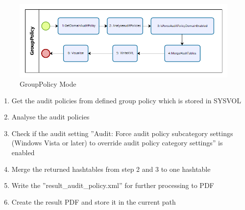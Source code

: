 \clearpage

\begin{figure}[H]
    \centering
    \includegraphics[width=1\linewidth]{assets/modes/grouppolicy.png}
    \caption{GroupPolicy Mode}
\end{figure}
\begin{enumerate}
    \item Get the audit policies from defined group policy which is stored in SYSVOL
    \item Analyse the audit policies
    \item Check if the audit setting ''Audit: Force audit policy subcategory settings (Windows Vista or later) to override audit policy category settings'' is enabled
    \item Merge the returned hashtables from step 2 and 3 to one hashtable
    \item Write the ''result\_audit\_policy.xml'' for further processing to PDF
    \item Create the result PDF and store it in the current path
\end{enumerate}

\clearpage

